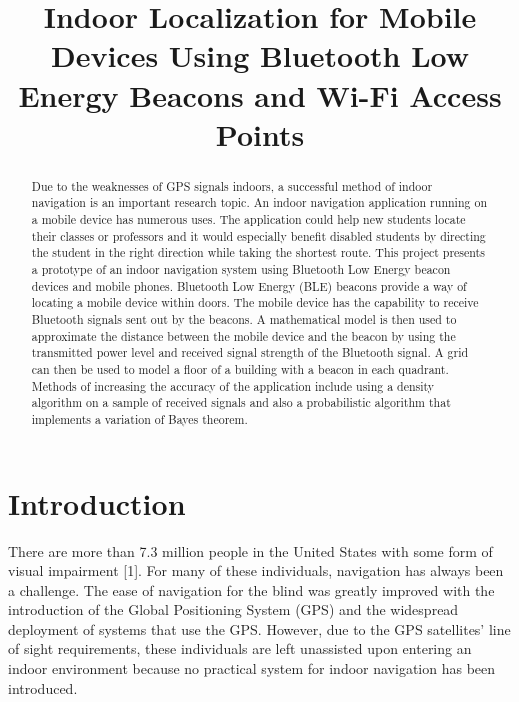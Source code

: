\documentclass[conference]{IEEEtran}
\begin{document}
\title{Indoor Localization for Mobile Devices Using Bluetooth Low Energy Beacons and Wi-Fi Access Points}

\author{
\and
{}
}

\maketitle

\begin{abstract}
Due to the weaknesses of GPS signals indoors, a successful method of indoor
navigation is an important research topic. An indoor navigation application
running on a mobile device has numerous uses. The application could help new
students locate their classes or professors and it would especially benefit
disabled students by directing the student in the right direction while taking
the shortest route. This project presents a prototype of an indoor navigation
system using Bluetooth Low Energy beacon devices and mobile phones.
Bluetooth Low Energy (BLE) beacons provide a way of locating a mobile device
within doors. The mobile device has the capability to receive Bluetooth signals
sent out by the beacons. A mathematical model is then used to approximate the
distance between the mobile device and the beacon by using the transmitted
power level and received signal strength of the Bluetooth signal. A grid can
then be used to model a floor of a building with a beacon in each quadrant.
Methods of increasing the accuracy of the application include using a density
algorithm on a sample of received signals and also a probabilistic algorithm
that implements a variation of Bayes theorem.
\end{abstract}

\section{Introduction}
There are more than 7.3 million people in the United States with some form of visual impairment [1]. For many of these individuals, navigation has always been a challenge. The ease of navigation for the blind was greatly improved with the introduction of the Global Positioning System (GPS) and the widespread deployment of systems that use the GPS. However, due to the GPS satellites’ line of sight requirements, these individuals are left unassisted upon entering an indoor environment because no practical system for indoor navigation has been introduced.
\end{document}

